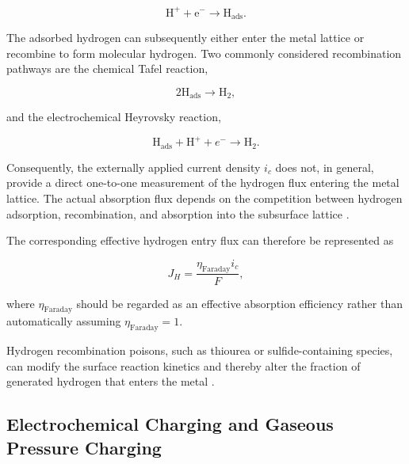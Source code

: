 \begin{equation}
\mathrm{H^+ + e^- \rightarrow H_{ads}}.
\label{eq:ch3_volmer}
\end{equation}

The adsorbed hydrogen can subsequently either enter the metal lattice
or recombine to form molecular hydrogen. Two commonly considered
recombination pathways are the chemical Tafel reaction,

\begin{equation}
2\mathrm{H}_{\mathrm{ads}}
\rightarrow
\mathrm{H}_2,
\label{eq:ch3_tafel}
\end{equation}

and the electrochemical Heyrovsky reaction,

\begin{equation}
\mathrm{H}_{\mathrm{ads}}
+
\mathrm{H^+}
+
e^-
\rightarrow
\mathrm{H}_2.
\label{eq:ch3_heyrovsky}
\end{equation}

Consequently, the externally applied current density $i_c$ does not,
in general, provide a direct one-to-one measurement of the hydrogen
flux entering the metal lattice. The actual absorption flux depends on
the competition between hydrogen adsorption, recombination, and
absorption into the subsurface lattice
\cite{Turnbull2014,Koren2024a}.

The corresponding effective hydrogen entry flux can therefore be
represented as

\begin{equation}
J_H
=
\frac{\eta_{\mathrm{Faraday}}i_c}{F},
\label{eq:ch3_effective_entry_flux}
\end{equation}

where $\eta_{\mathrm{Faraday}}$ should be regarded as an effective
absorption efficiency rather than automatically assuming
$\eta_{\mathrm{Faraday}}=1$.

Hydrogen recombination poisons, such as thiourea or sulfide-containing
species, can modify the surface reaction kinetics and thereby alter
the fraction of generated hydrogen that enters the metal
\cite{Turnbull2014,Ohaeri2018,Koren2024a,Zha2025}.

\subsection{Electrochemical Charging and Gaseous Pressure Charging}
\label{subsec:electrochemical_vs_gas}

